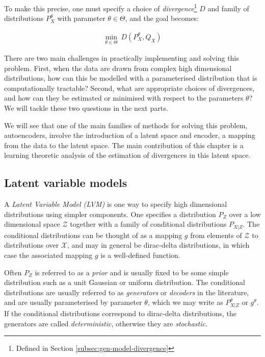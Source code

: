 To make this precise, one must specify a choice of \emph{divergence}\footnote{Defined in Section \ref{subsec:gen-model-divergence}} $D$ and family of distributions $P_X^\theta$ with parameter $\theta\in\Theta$, and the goal becomes:

\begin{align*}
\min_{\theta \in \Theta} \ D\left(P_X^\theta,  Q_X \right)
\end{align*}

There are two main challenges in practically implementing and solving this problem.
First, when the data are drawn from complex high dimensional distributions, how can this be modelled with a parameterised distribution that is computationally tractable?
Second, what are appropriate choices of divergences, and how can they be estimated or minimised with respect to the parameters $\theta$?
We will tackle these two questions in the next parts. 

We will see that one of the main families of methods for solving this problem, autoencoders, involve the introduction of a latent space and encoder, a mapping from the data to the latent space.
The main contribution of this chapter is a learning theoretic analysis of the estimation of divergences in this latent space. 

\subsection{Latent variable models}

A \emph{Latent Variable Model (LVM)} is one way to specify high dimensional distributions using simpler components. 
One specifies a distribution $P_Z$ over a low dimensional space $\mathcal{Z}$ together with a family of conditional distributions $P_{X|Z}$. 
The conditional distributions can be thought of as a mapping $g$ from elements of $\mathcal{Z}$ to distributions over $\mathcal{X}$,
and may in general be dirac-delta distributions, in which case the associated mapping $g$ is a well-defined function. 

Often $P_Z$ is referred to as a \emph{prior} and is usually fixed to be some simple distribution such as a unit Gaussian or uniform distribution. 
The conditional distributions are usually referred to as \emph{generators} or \emph{decoders} in the literature, and are usually parameterised by parameter $\theta$, which we may write as $P_{X|Z}^\theta$ or $g^\theta$. 
If the conditional distributions correspond to dirac-delta distributions, the generators are called \emph{deterministic}, otherwise they are \emph{stochastic}.

